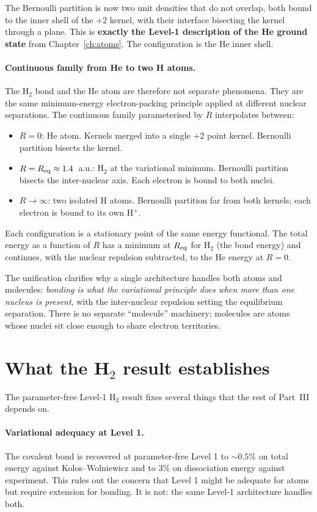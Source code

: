 The Bernoulli partition is now two unit densities that do not overlap, both bound to the inner shell of the $+2$ kernel, with their interface bisecting the kernel through a plane. This is \textbf{exactly the Level-1 description of the He ground state} from Chapter~\ref{ch:atoms}. The configuration is the He inner shell.

\paragraph{Continuous family from He to two H atoms.}
The H$_2$ bond and the He atom are therefore not separate phenomena. They are the same minimum-energy electron-packing principle applied at different nuclear separations. The continuous family parameterised by $R$ interpolates between:
\begin{itemize}
\item $R = 0$: He atom. Kernels merged into a single $+2$ point kernel. Bernoulli partition bisects the kernel.
\item $R = R_{\rm eq} \approx 1.4$~a.u.: H$_2$ at the variational minimum. Bernoulli partition bisects the inter-nuclear axis. Each electron is bound to both nuclei.
\item $R \to \infty$: two isolated H atoms. Bernoulli partition far from both kernels; each electron is bound to its own H$^+$.
\end{itemize}
Each configuration is a stationary point of the same energy functional. The total energy as a function of $R$ has a minimum at $R_{\rm eq}$ for H$_2$ (the bond energy) and continues, with the nuclear repulsion subtracted, to the He energy at $R = 0$.

The unification clarifies why a single architecture handles both atoms and molecules: \emph{bonding is what the variational principle does when more than one nucleus is present}, with the inter-nuclear repulsion setting the equilibrium separation. There is no separate ``molecule'' machinery; molecules are atoms whose nuclei sit close enough to share electron territories.

\section{What the H$_2$ result establishes}\label{sec:h2-meaning}

The parameter-free Level-1 H$_2$ result fixes several things that the rest of Part~III depends on.

\paragraph{Variational adequacy at Level 1.} The covalent bond is recovered at parameter-free Level 1 to $\sim 0.5\%$ on total energy against Kolos--Wolniewicz and to 3\% on dissociation energy against experiment. This rules out the concern that Level 1 might be adequate for atoms but require extension for bonding. It is not: the same Level-1 architecture handles both.

